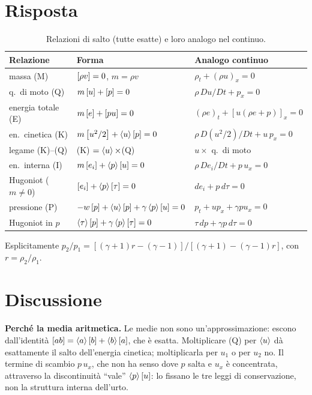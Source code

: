 \section*{Risposta}
\begin{table}[H]
  \centering
  \small
  \begin{tabular}{lll}
    \toprule
    Relazione & Forma & Analogo continuo \\
    \midrule
    massa (M) & $\left[\rho v\right]=0$, $m=\rho v$ & $\rho_t+(\rho u)_x=0$ \\
    q.\ di moto (Q) & $m\left[u\right]+\left[p\right]=0$ & $\rho\,Du/Dt+p_x=0$ \\
    energia totale (E) & $m\left[e\right]+\left[pu\right]=0$ & $(\rho e)_t+[u(\rho e+p)]_x=0$ \\
    \midrule
    en.\ cinetica (K) & $m\left[u^2/2\right]+\left\langle u\right\rangle\left[p\right]=0$ & $\rho\,D(u^2/2)/Dt+u\,p_x=0$ \\
    legame (K)--(Q) & (K) $=\left\langle u\right\rangle\times$(Q) & $u\times$ q.\ di moto \\
    en.\ interna (I) & $m\left[e_i\right]+\left\langle p\right\rangle\left[u\right]=0$ & $\rho\,De_i/Dt+p\,u_x=0$ \\
    Hugoniot ($m\neq0$) & $\left[e_i\right]+\left\langle p\right\rangle\left[\tau\right]=0$ & $de_i+p\,d\tau=0$ \\
    pressione (P) & $-w\left[p\right]+\left\langle u\right\rangle\left[p\right]+\gamma\left\langle p\right\rangle\left[u\right]=0$ & $p_t+up_x+\gamma pu_x=0$ \\
    Hugoniot in $p$ & $\left\langle \tau\right\rangle\left[p\right]+\gamma\left\langle p\right\rangle\left[\tau\right]=0$ & $\tau\,dp+\gamma p\,d\tau=0$ \\
    \bottomrule
  \end{tabular}
  \caption{Relazioni di salto (tutte esatte) e loro analogo nel continuo.}
\end{table}
Esplicitamente $p_2/p_1=[(\gamma+1)r-(\gamma-1)]/[(\gamma+1)-(\gamma-1)r]$, con $r=\rho_2/\rho_1$.

\section*{Discussione}
\textbf{Perché la media aritmetica.} Le medie non sono un'approssimazione: escono dall'identità
$\left[ab\right]=\left\langle a\right\rangle\left[b\right]+\left\langle b\right\rangle\left[a\right]$, che è esatta. Moltiplicare (Q) per $\left\langle u\right\rangle$ dà esattamente il salto
dell'energia cinetica; moltiplicarla per $u_1$ o per $u_2$ no. Il termine di scambio $p\,u_x$, che non ha senso
dove $p$ salta e $u_x$ è concentrata, attraverso la discontinuità ``vale'' $\left\langle p\right\rangle\left[u\right]$: lo fissano le tre leggi
di conservazione, non la struttura interna dell'urto.

